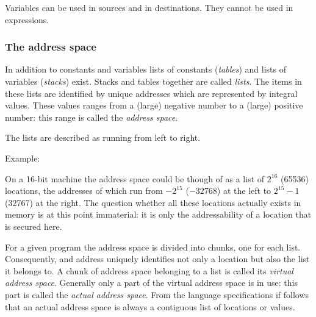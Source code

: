 \documentclass{article}
\newcommand\g[1]{{\sf #1}}
\begin{document}
Variables can be used in \g{source}s and in \g{destination}s. They cannot be
used in \g{expression}s.

\subsubsection{The address space}\label{4.1.4}

In addition to constants and variables lists of constants
(\emph{tables}) and lists of variables (\emph{stacks}) exist. Stacks and tables
together are called \emph{lists}. The items in these lists are identified
by unique addresses which are represented by integral values. These values
ranges from a (large) negative number to a (large) positive number:
this range is called the \emph{address space}.

The lists are described as running from left to right.

\smallskip\noindent
Example:

\noindent
On a 16-bit machine the address space could be though of as a list of
$2^{16}$ (65536) locations, the addresses of which run from $-2^{15}$ 
($-32768$) at the left to $2^{15}-1$ (32767) at the right. The question
whether all these locations actually exists in memory is at this point
immaterial: it is only the addressability of a location that is secured
here.

\smallskip

For a given program the address space is divided into chunks, one for each
list. Consequently, and address uniquely identifies not only a location but
also the list it belongs to. A chunk of address space belonging to a list is
called its \emph{virtual address space}. Generally only a part of the
virtual address space is in use: this part is called the \emph{actual
address space}. From the language specifications if follows that an actual
address space is always a contiguous list of locations or values.
\end{document}
